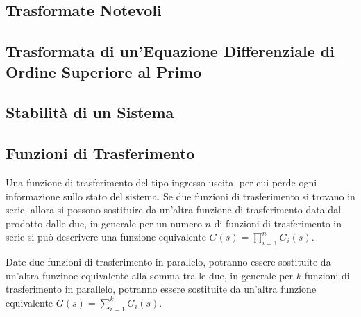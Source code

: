 \documentclass{article}
\numberwithin{equation}{subsection}
\begin{document}
\subsection{Trasformate Notevoli}

\subsection{Trasformata di un'Equazione Differenziale di Ordine Superiore al Primo}

\subsection{Stabilità di un Sistema}

\subsection{Funzioni di Trasferimento}
Una funzione di trasferimento del tipo ingresso-uscita, per cui perde ogni informazione sullo stato del sistema.
Se due funzioni di trasferimento si trovano in serie, allora si possono sostituire da un'altra funzione di trasferimento data dal prodotto dalle due, 
in generale per un numero $n$ di funzioni di trasferimento in serie si può descrivere una funzione equivalente $G(s)=\prod_{i=1}^nG_i(s)$. 

\begin{center}
\end{center}
\vspace{0.25cm}
\begin{center}
\end{center}

Date due funzioni di trasferimento in parallelo, potranno essere sostituite da un'altra funzinoe equivalente alla somma tra le due, in generale 
per $k$ funzioni di trasferimento in parallelo, potranno essere sostituite da un'altra funzione equivalente $G(s)=\sum_{i=1}^kG_i(s)$. 
\end{document}
